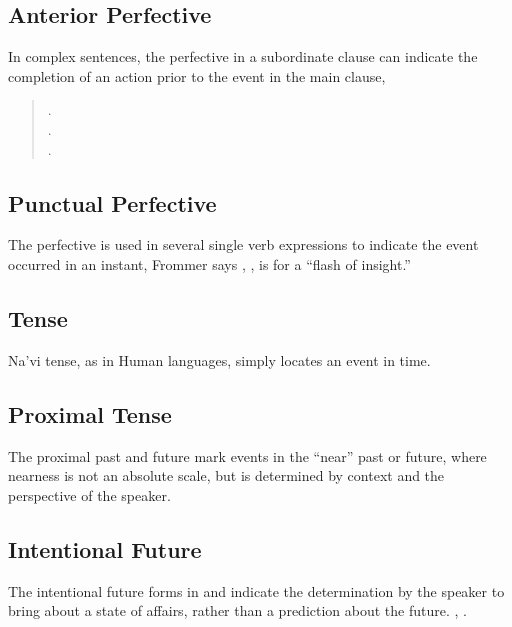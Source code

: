 \subsection{Anterior Perfective} In complex sentences, the perfective
in a subordinate clause can indicate the completion of an action prior
to the event in the main clause, 

\begin{quotation}
\noindent{}.\\
\indent{}.\\

\noindent{}.\\
\indent{}
\end{quotation}

\subsection{Punctual Perfective} The perfective is used in several
single verb expressions to indicate the event occurred in an instant,
   
Frommer says , , is for a ``flash of insight.''

\subsection{Tense} Na'vi tense, as in Human languages, simply locates
an event in time.


\subsection{Proximal Tense} The proximal past and future mark events
in the ``near'' past or future, where nearness is not an absolute
scale, but is determined by context and the perspective of the
speaker.

\subsection{Intentional Future} The intentional future forms in
 and  indicate the deter\-mina\-tion by the
speaker to bring about a state of affairs, rather than a prediction
about the future.   , 
.\label{syn:verb:intenfut}


